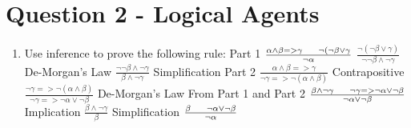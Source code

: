 \documentclass{article}
\begin{document}
    \section*{Question 2 - Logical Agents}
    \begin{enumerate}
        \item Use inference to prove the following rule:
        \newline
        \newline
        Part 1
        \newline
        \newline
        $\frac{\alpha \land \beta => \gamma \hspace{0.5cm}\lnot(\lnot \beta \lor \gamma}{\lnot \alpha}$
        \newline
        \newline
        $\frac{\lnot(\lnot \beta \lor \gamma)}{\lnot \lnot \beta \land \lnot \gamma}$ De-Morgan's Law
        \newline
        \newline
        $\frac{\lnot \lnot \beta \land \lnot \gamma}{\beta \land \lnot \gamma}$ Simplification
        \newline
        \newline
        Part 2
        \newline
        \newline
        $\frac{\alpha \land \beta => \gamma}{\lnot \gamma => \lnot (\alpha \land \beta)}$ Contrapositive
        \newline
        \newline
        $\frac{\lnot \gamma => \lnot (\alpha \land \beta)}{\lnot \gamma => \lnot \alpha \lor \lnot \beta}$ De-Morgan's Law
        \newline
        \newline
        From Part 1 and Part 2
        \newline
        \newline
        $\frac{\beta \land \lnot \gamma \hspace{0.5cm} \lnot \gamma => \lnot \alpha \lor \lnot \beta} {\lnot \alpha \lor \lnot \beta}$ Implication
        \newline
        \newline
        $\frac{\beta \land \lnot \gamma} {\beta}$ Simplification
        \newline
        \newline
        $\frac{\beta \hspace{0.5cm} \lnot \alpha \lor \lnot \beta}{\lnot \alpha}$

\end{enumerate}
\end{document}
